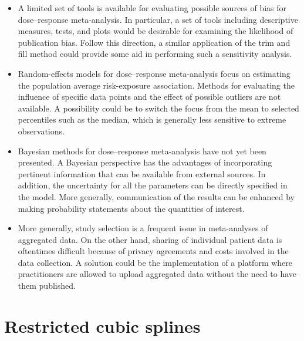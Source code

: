 \documentclass[11pt,a4paper,twoside,openany]{book}\usepackage{knitr}
\begin{document}
{{\begin{itemize}
\item A limited set of tools is available for evaluating possible sources of bias for dose--response meta-analysis. In particular, a set of tools including descriptive measures, tests, and plots would be desirable for examining the likelihood of publication bias. Follow this direction, a similar application of the trim and fill method could provide some aid in performing such a sensitivity analysis.

\item Random-effects models for dose--response meta-analysis focus on estimating the population average risk-exposure association. Methods for evaluating the influence of specific data points and the effect of possible outliers are not available. A possibility could be to switch the focus from the mean to selected percentiles such as the median, which is generally less sensitive to extreme observations.

\item Bayesian methods for dose--response meta-analysis have not yet been presented. A Bayesian perspective has the advantages of incorporating pertinent information that can be available from external sources. In addition, the uncertainty for all the parameters can be directly specified in the model. More generally, communication of the results can be enhanced by making probability statements about the quantities of interest.

\item More generally, study selection is a frequent issue in meta-analyses of aggregated data. On the other hand, sharing of individual patient data is oftentimes difficult because of privacy agreements and costs involved in the data collection. A solution could be the implementation of a platform where practitioners are allowed to upload aggregated data without the need to have them published.

\end{itemize}

\appendix


%

\chapter{Restricted cubic splines}\label{sec:rcs}

}}
\end{document}
